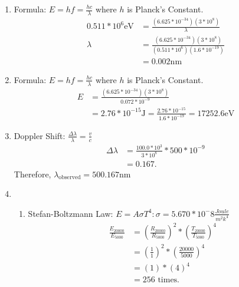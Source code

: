 \documentclass{article}
\begin{document}
\begin{enumerate}
    \item
    
    Formula: $E=hf=\frac{hc}{\lambda}$ where $h$ is Planck's Constant.\\
    \begin{align*}
    0.511*10^6\text{eV} &= \frac{(6.625*10^{-34})(3*10^8)}{\lambda}\\
    \lambda &= \frac{(6.625*10^{-34})(3*10^8)}{(0.511*10^6)(1.6*10^{-19})}\\
    &= 0.002\text{nm}
    \end{align*}
    
    \item
    
    Formula: $E=hf=\frac{hc}{\lambda}$ where $h$ is Planck's Constant.\\
    \begin{align*}
        E &= \frac{(6.625*10^{-34})(3*10^8)}{0.072*10^{-9}}\\
        &= 2.76*10^{-15}\text{J} = \frac{2.76*10^{-15}}{1.6*10^{-19}} = 17252.6\text{eV}
    \end{align*}
    
    \item
    
    Doppler Shift: $\frac{\Delta \lambda}{\lambda}=\frac{v}{c}$\\
    \begin{align*}
        \Delta \lambda &= \frac{100.0*10^3}{3*10^8}*500*10^{-9}\\
        &= 0.167.
    \end{align*}
    Therefore, $\lambda_{\text{observed}} = 500.167\text{nm}$
    
    \item
    
    \begin{enumerate}
        \item 
        
        Stefan-Boltzmann Law: $E=A\sigma T^4: \sigma = 5.670*10^-8 \frac{Joule}{m^2k^4}$\\
        \begin{align*}
            \frac{E_{20000}}{E_{5000}} &= (\frac{R_{20000}}{R_{5000}})^2*(\frac{T_{20000}}{T_{5000}})^4\\
            &= (\frac{1}{1})^2*(\frac{20000}{5000})^4\\
            &= (1)*(4)^4\\
            &= 256 \text{ times.}
        \end{align*}
        

\end{enumerate}
\end{enumerate}
\end{document}
